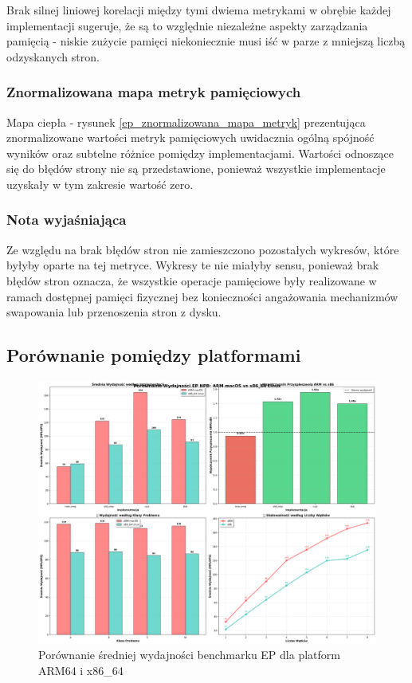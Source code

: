 Brak silnej liniowej korelacji między tymi dwiema metrykami w obrębie każdej implementacji sugeruje, że są to względnie niezależne aspekty zarządzania pamięcią - niskie zużycie pamięci niekoniecznie musi iść w parze z mniejszą liczbą odzyskanych stron.

\subsubsection{Znormalizowana mapa metryk pamięciowych}
Mapa ciepła - rysunek \ref{ep_znormalizowana_mapa_metryk} prezentująca znormalizowane wartości metryk pamięciowych uwidacznia ogólną spójność wyników oraz subtelne różnice pomiędzy implementacjami. Wartości odnoszące się do błędów strony nie są przedstawione, ponieważ wszystkie implementacje uzyskały w tym zakresie wartość zero.

\subsubsection{Nota wyjaśniająca}
Ze względu na brak błędów stron nie zamieszczono pozostałych wykresów, które byłyby oparte na tej metryce. Wykresy te nie miałyby sensu, ponieważ brak błędów stron oznacza, że wszystkie operacje pamięciowe były realizowane w ramach dostępnej pamięci fizycznej bez konieczności angażowania mechanizmów swapowania lub przenoszenia stron z dysku.


\subsection{Porównanie pomiędzy platformami}
\begin{figure}[H]
    \centering
    \includegraphics[width=\textwidth]{analiza/images/parallel/ep/compare/ep_porownanie_platform_arm_vs_x86.png}
    \caption{Porównanie średniej wydajności benchmarku EP dla platform ARM64 i x86\_64}
    \label{ep_porownanie_platform_arm_vs_x86}
\end{figure}
